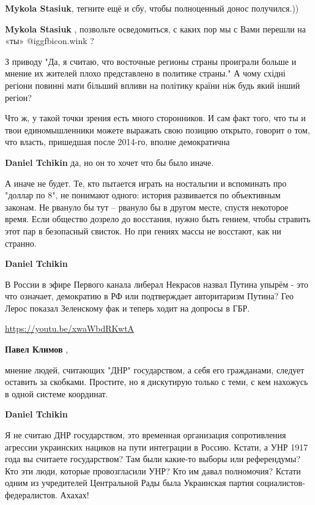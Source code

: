 \begin{itemize}
\begin{itemize}
\textbf{Mykola Stasiuk}, тегните ещё и сбу, чтобы полноценный донос получился.))

\textbf{Mykola Stasiuk} , позвольте осведомиться, с каких пор мы с Вами перешли на «ты»  @igg{fbicon.wink} ?
\end{itemize} %


З приводу "Да, я считаю, что восточные регионы страны проиграли больше и мнение
их жителей плохо представлено в политике страны." А чому східні регіони повинні
мати більший впливи на політику країни ніж будь який інший регіон?



Что ж, у такой точки зрения есть много сторонников. И сам факт того, что ты и
твои единомышленники можете выражать свою позицию открыто, говорит о том, что
власть, пришедшая после 2014-го, вполне демократична

\begin{itemize} %
\textbf{Daniel Tchikin} да, но он то хочет что бы было иначе.


А иначе не будет. Те, кто пытается играть на ностальгии и вспоминать про
"доллар по 8", не понимают одного: история развивается по объективным законам.
Не рвануло бы тут – рвануло бы в другом месте, спустя некоторое время. Если
общество дозрело до восстания, нужно быть гением, чтобы стравить этот пар в
безопасный свисток. Но при гениях массы не восстают, как ни странно.


\textbf{Daniel Tchikin} 

В России в эфире Первого канала либерал Некрасов назвал Путина упырём - это что
означает, демократию в РФ или подтверждает авторитаризм Путина? Гео Лерос
показал Зеленскому фак и теперь ходит на допросы в ГБР. 

\url{https://youtu.be/xwaWbdRKwtA}

\textbf{Павел Климов} , 

мнение людей, считающих "ДНР" государством, а себя его гражданами, следует
оставить за скобками. Простите, но я дискутирую только с теми, с кем нахожусь в
одной системе координат.

\textbf{Daniel Tchikin} 

Я не считаю ДНР государством, это временная организация сопротивления агрессии
украинских нациков на пути интеграции в Россию. Кстати, а УНР 1917 года вы
считаете государством? Там были какие-то выборы или референдумы? Кто эти люди,
которые провозгласили УНР? Кто им давал полномочия? Кстати одним из учредителей
Центральной Рады была Украинская партия социалистов-федералистов. Ахахах!


\end{itemize}
\end{itemize}
